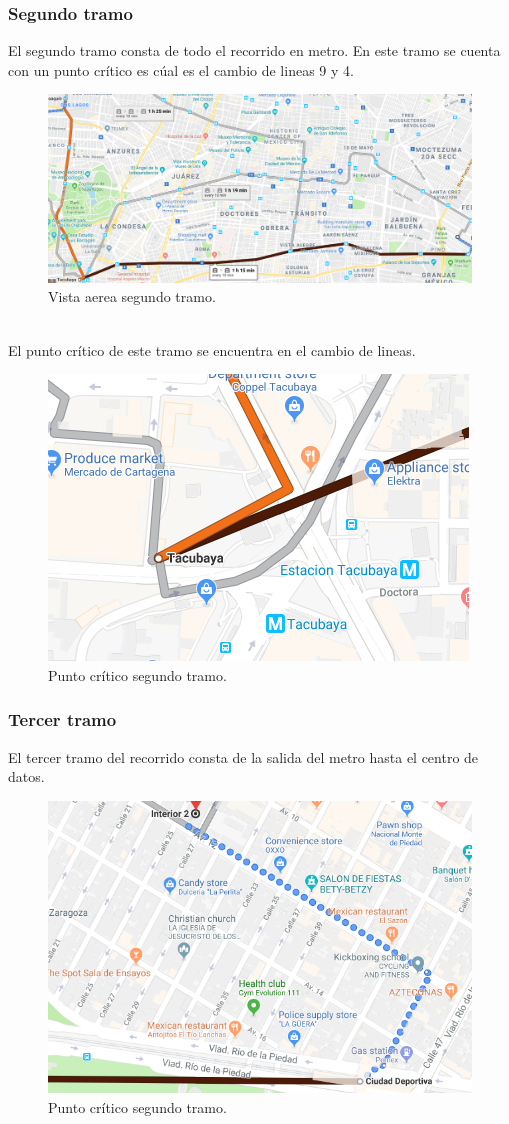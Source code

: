 \documentclass[12pt,letterpaper]{article}
\begin{document}
\subsubsection{Segundo tramo}
El segundo tramo consta de todo el recorrido en metro. En este 
tramo se cuenta con un punto crítico es cúal es el cambio de lineas 
9 y 4.
\begin{figure}[ht]
    \centering
    \includegraphics[width=1\textwidth]{f7.png}
    \caption{Vista aerea segundo tramo.}
\end{figure}
\\
El punto crítico de este tramo se encuentra en el cambio de lineas.
\begin{figure}[ht]
    \centering
    \includegraphics[width=.5\textwidth]{f8.png}
    \caption{Punto crítico segundo tramo.}
\end{figure}

\newpage
\subsubsection{Tercer tramo}
El tercer tramo del recorrido consta de la salida del metro hasta
el centro de datos.
\begin{figure}[ht]
    \centering
    \includegraphics[width=.5\textwidth]{f9.png}
    \caption{Punto crítico segundo tramo.}
\end{figure}
\end{document}
